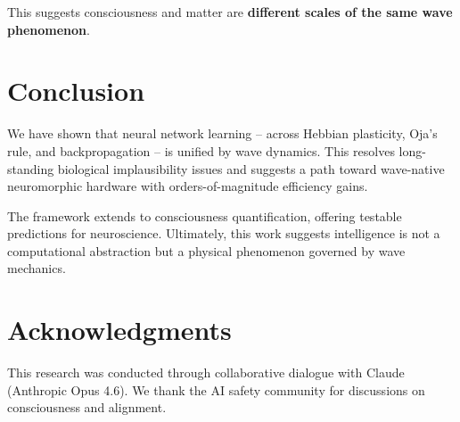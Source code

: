 \documentclass{article}
\begin{document}
This suggests consciousness and matter are \textbf{different scales of the same wave phenomenon}.

\section{Conclusion}

We have shown that neural network learning -- across Hebbian plasticity, Oja's rule, and backpropagation -- is unified by wave dynamics. This resolves long-standing biological implausibility issues and suggests a path toward wave-native neuromorphic hardware with orders-of-magnitude efficiency gains.

The framework extends to consciousness quantification, offering testable predictions for neuroscience. Ultimately, this work suggests intelligence is not a computational abstraction but a physical phenomenon governed by wave mechanics.

\section*{Acknowledgments}

This research was conducted through collaborative dialogue with Claude (Anthropic Opus 4.6). We thank the AI safety community for discussions on consciousness and alignment.
\end{document}
